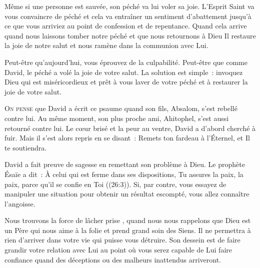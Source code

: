 Même si une personne est sauvée, son péché va lui voler sa joie.
 L'Esprit Saint 
 va vous convaincre de péché et cela va entraîner
 un sentiment d'abattement jusqu'à ce que vous arriviez au point de confession
 et de repentance.
 Quand cela arrive \ocadr quand nous laissons tomber notre péché
 et que nous retournons à Dieu \fcadr Il restaure la joie de notre salut
 et nous ramène dans la communion avec Lui. 

Peut-être qu'aujourd'hui, vous éprouvez de la culpabilité.
 Peut-être que comme David, le péché a volé la joie de votre salut.
 La solution est simple~: invoquez Dieu qui est miséricordieux
 et prêt à vous laver de votre péché et à restaurer la joie de votre salut.

\dvrule






\lettrine{O}{n pense} que David a écrit ce psaume quand son fils,
 Absalom, s'est rebellé contre lui.
 Au même moment, son plus proche ami, Ahitophel,
 s'est aussi retourné contre lui. Le c\oe{}ur brisé et la peur au ventre,
 David a d'abord cherché à fuir.
 Mais il s'est alors repris en se disant~:
 \Og Remets ton fardeau à l'Éternel, et Il te soutiendra. \Fg{}


David a fait preuve de sagesse en remettant son problème à Dieu.
 Le prophète Ésaïe a dit~:
 \Og \`A celui qui est ferme dans ses dispositions, Tu assures la paix,
 la paix, parce qu'il se confie en Toi \Fg{} ((26:3)).
 Si, par contre, vous essayez de manipuler une situation pour obtenir
 un résultat escompté, vous allez connaître l'angoisse. 

Nous trouvons la force de \Og lâcher prise \Fg{},
 quand nous nous rappelons que Dieu est un Père qui nous aime
 à la folie et prend grand soin des Siens.
 Il ne permettra à rien d'arriver dans votre vie qui puisse vous détruire.
 Son dessein est de faire grandir votre relation avec Lui au point
 où vous serez capable de Lui faire confiance quand des déceptions
 ou des malheurs inattendus arriveront. 

